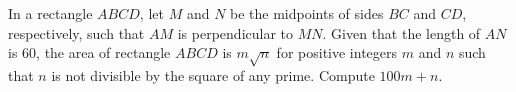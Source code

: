 In a rectangle $ABCD$, let $M$ and $N$ be the midpoints of sides $BC$ and $CD$, respectively, such that $AM$ is perpendicular to $MN$. Given that the length of $AN$ is $60$, the area of rectangle $ABCD$ is $m \sqrt{n}$ for positive integers $m$ and $n$ such that $n$ is not divisible by the square of any prime. Compute $100m+n$.
